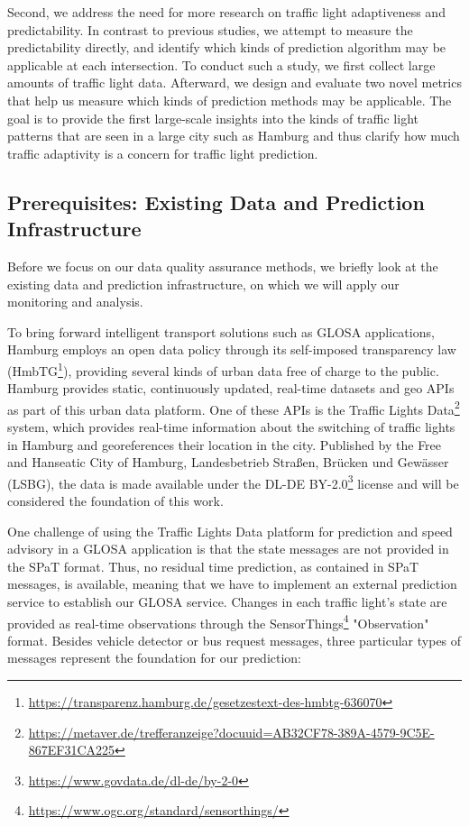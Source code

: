 Second, we address the need for more research on traffic light adaptiveness and predictability. In contrast to previous studies, we attempt to measure the predictability directly, and identify which kinds of prediction algorithm may be applicable at each intersection. To conduct such a study, we first collect large amounts of traffic light data. Afterward, we design and evaluate two novel metrics that help us measure which kinds of prediction methods may be applicable. The goal is to provide the first large-scale insights into the kinds of traffic light patterns that are seen in a large city such as Hamburg and thus clarify how much traffic adaptivity is a concern for traffic light prediction.

\subsection{Prerequisites: Existing Data and Prediction Infrastructure}

Before we focus on our data quality assurance methods, we briefly look at the existing data and prediction infrastructure, on which we will apply our monitoring and analysis.

To bring forward intelligent transport solutions such as GLOSA applications, Hamburg employs an open data policy through its self-imposed transparency law (HmbTG\footnote{\url{https://transparenz.hamburg.de/gesetzestext-des-hmbtg-636070}}), providing several kinds of urban data free of charge to the public. Hamburg provides static, continuously updated, real-time datasets and geo APIs as part of this urban data platform. One of these APIs is the Traffic Lights Data\footnote{\url{https://metaver.de/trefferanzeige?docuuid=AB32CF78-389A-4579-9C5E-867EF31CA225}} system, which provides real-time information about the switching of traffic lights in Hamburg and georeferences their location in the city. Published by the Free and Hanseatic City of Hamburg, Landesbetrieb Straßen, Brücken und Gewässer (LSBG), the data is made available under the DL-DE BY-2.0\footnote{\url{https://www.govdata.de/dl-de/by-2-0}} license and will be considered the foundation of this work.

One challenge of using the Traffic Lights Data platform for prediction and speed advisory in a GLOSA application is that the state messages are not provided in the SPaT format. Thus, no residual time prediction, as contained in SPaT messages, is available, meaning that we have to implement an external prediction service to establish our GLOSA service. Changes in each traffic light's state are provided as real-time observations through the SensorThings\footnote{\url{https://www.ogc.org/standard/sensorthings/}} "Observation" format. Besides vehicle detector or bus request messages, three particular types of messages represent the foundation for our prediction:

